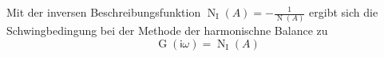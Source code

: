 Mit der inversen Beschreibungsfunktion $\operatorname{N}_{\mathrm{I}}(A) = - \frac{1}{\operatorname{N}(A)}$ ergibt sich die Schwingbedingung bei der Methode der harmonischne Balance zu
$$\operatorname{G}(\mathsf{i} \omega) = \operatorname{N}_{\mathrm{I}}(A)$$ 
